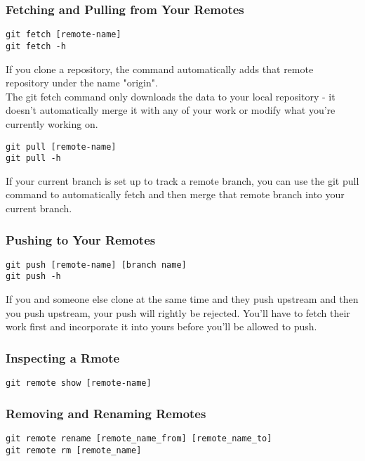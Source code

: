 \documentclass[11pt]{article}
\begin{document}
\subsubsection{Fetching and Pulling from Your Remotes}
\label{sec:org99f9a9e}
\begin{verbatim}
git fetch [remote-name]
git fetch -h
\end{verbatim}

If you clone a repository, the command automatically adds that remote repository under the name "origin".\\

The git fetch command only downloads the data to your local repository - it doesn't automatically merge it with any of your work or modify what you're currently working on.\\

\begin{verbatim}
git pull [remote-name]
git pull -h
\end{verbatim}
If your current branch is set up to track a remote branch, you can use the git pull command to automatically fetch and then merge that remote branch into your current branch.\\

\subsubsection{Pushing to Your Remotes}
\label{sec:orgc917af4}
\begin{verbatim}
git push [remote-name] [branch name]
git push -h
\end{verbatim}
If you and someone else clone at the same time and they push upstream and then you push upstream, your push will rightly be rejected. You'll have to fetch their work first and incorporate it into yours before you'll be allowed to push.\\

\subsubsection{Inspecting a Rmote}
\label{sec:org7e8ee5a}
\begin{verbatim}
git remote show [remote-name]
\end{verbatim}

\subsubsection{Removing and Renaming Remotes}
\label{sec:org645007e}
\begin{verbatim}
git remote rename [remote_name_from] [remote_name_to]
git remote rm [remote_name]
\end{verbatim}
\end{document}
